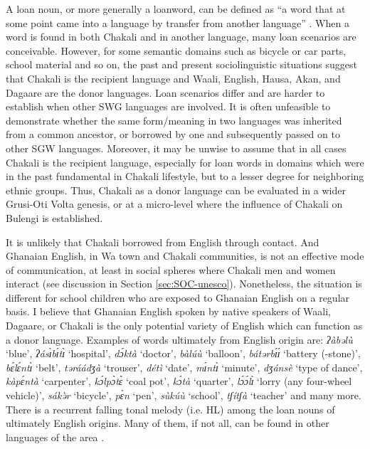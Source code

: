 \begin{exe}
\begin{exe}
\begin{exe}
{\begin{exe}
\begin{exe}
\begin{exe}
\begin{exe}
\begin{exe}
\begin{exe}
\begin{exe}
 A loan noun,  or more generally a loanword, can be defined as  ``a word that at
some point came into a language by transfer from another language''
\citep[58]{Hasp08}.  When a word is found in both Chakali and in another
language, many loan scenarios are conceivable. However,  for some semantic
domains such as   bicycle or car parts, school material and so on, the past and
present sociolinguistic situations  suggest that Chakali is
the recipient language and Waali, English, Hausa, Akan, and Dagaare are the
donor
languages.  Loan scenarios differ and are harder to establish when other SWG
languages are involved. It is often unfeasible to demonstrate whether the same
form/meaning in two languages was inherited from a common ancestor, or  
borrowed by one and subsequently passed on to other SGW languages. Moreover, it
may be unwise to assume that in all cases Chakali is  the recipient language,
especially for loan words in domains which  were in the past fundamental in
Chakali lifestyle,  but to a lesser degree for neighboring ethnic groups. 
Thus, Chakali as a donor language can be evaluated in a wider Grusi-Oti Volta
genesis, or  at a micro-level where the influence of Chakali on Bulengi is
established.

It is unlikely that Chakali borrowed from English through contact. And Ghanaian
English, in Wa town and Chakali communities,  is not an effective mode of
communication, at least in social spheres where Chakali men and women 
interact (see discussion in Section \ref{sec:SOC-unesco}).  Nonetheless, the
situation is different for school children  who are
exposed to Ghanaian English on a regular basis. I believe that Ghanaian English
spoken by native speakers of Waali, Dagaare, or Chakali  is the only potential
variety of English which can function as a donor language. Examples of words 
ultimately  from English origin are: {\it ʔàbəlù} `blue', {\it ʔásɪ̀bɪ́tɪ̀} 
`hospital',    {\it dɔ́ktà} `doctor', {\it bàlúù} `balloon', {\it 
bátərbɪ́ɪ́} 
`battery (-stone)', {\it bɛ́lɛ́ntɪ̀} `belt',  {\it təráádʒà} `trouser',  
{\it 
détì} `date',    {\it mɪ́ntɪ̀} `minute',   {\it dʒánsè} `type of dance',  
{\it 
kàpɛ́ntà} `carpenter', {\it kɔ́lpɔ̀tɛ̀} `coal pot', {\it kɔ́tà} `quarter',  
{\it 
lɔ́ɔ́lɪ̀} `lorry (any four-wheel vehicle)',   {\it sákə̀r} `bicycle',  {\it 
pɛ̀n} 
`pen', {\it sùkúù} `school',   {\it tʃítʃà} `teacher' and many more.  
There 
is a recurrent falling tonal melody (i.e. HL) among the loan nouns of  
ultimately English origins. Many of them,  if not all, can be found in other 
languages of the area \citep{sisa75, daku07}. 


\end{exe}
\end{exe}
\end{exe}
\end{exe}
\end{exe}
\end{exe}
\end{exe}}
\end{exe}
\end{exe}
\end{exe}

